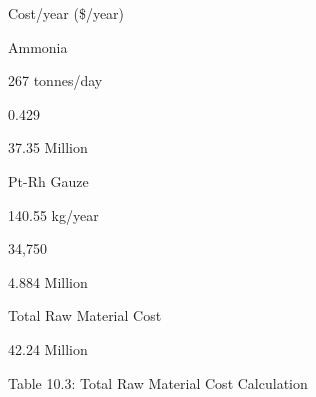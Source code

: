 \documentclass[a4paper,portrait,12pt]{article}
\begin{document}
\begin{flushleft}
Cost/year (\$/year)
\end{flushleft}





\begin{flushleft}
Ammonia
\end{flushleft}





\begin{flushleft}
267 tonnes/day
\end{flushleft}





0.429





\begin{flushleft}
37.35 Million
\end{flushleft}





\begin{flushleft}
Pt-Rh Gauze
\end{flushleft}





\begin{flushleft}
140.55 kg/year
\end{flushleft}





34,750





\begin{flushleft}
4.884 Million
\end{flushleft}





\begin{flushleft}
Total Raw Material Cost
\end{flushleft}





\begin{flushleft}
42.24 Million
\end{flushleft}





\begin{flushleft}
Table 10.3: Total Raw Material Cost Calculation
\end{flushleft}
\end{document}
